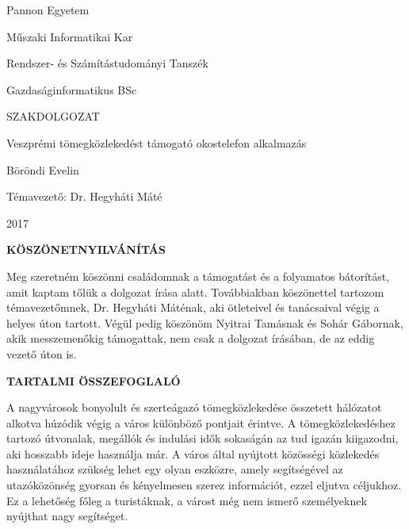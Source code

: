 \documentclass[a4paper,oneside,10pt]{report}
\begin{document}
\begin{titlepage}
\begin{center}
\Large
Pannon Egyetem

\vspace{10mm}
Műszaki Informatikai Kar

\vspace{10mm}
Rendszer- és Számítástudományi Tanszék

\vspace{10mm}
Gazdaságinformatikus BSc

\vspace{40mm}
\huge
SZAKDOLGOZAT

\vspace{10mm}
\LARGE
Veszprémi tömegközlekedést támogató okostelefon alkalmazás 

\vspace{10mm}
\Large
Böröndi Evelin

\vspace{40mm}
Témavezető: Dr. Hegyháti Máté

\vspace{10mm}
2017
\normalsize
\end{center}
\end{titlepage}



\pagestyle{empty} %



\newpage
\Large
\begin{center}
	\textbf{KÖSZÖNETNYILVÁNÍTÁS}
\end{center}
\normalsize
\noindent
Meg szeretném köszönni családomnak a támogatást és a folyamatos bátorítást, amit kaptam tőlük a dolgozat írása alatt. 
Továbbiakban köszönettel tartozom témavezetőmnek, Dr. Hegyháti Máténak, aki ötleteivel és tanácsaival végig a helyes úton tartott.
Végül pedig köszönöm Nyitrai Tamásnak és Sohár Gábornak, akik messzemenőkig támogattak, nem csak a dolgozat írásában, de az eddig vezető úton is.

\newpage
\Large
\begin{center}
	\textbf{TARTALMI ÖSSZEFOGLALÓ}
\end{center}
\normalsize
\noindent

A nagyvárosok bonyolult és szerteágazó tömegközlekedése összetett hálózatot alkotva húzódik végig a város különböző pontjait érintve.
A tömegközlekedéshez tartozó útvonalak, megállók és indulási idők sokaságán az tud igazán kiigazodni, aki hosszabb ideje használja már. 
A város által nyújtott közösségi közlekedés használatához szükség lehet egy olyan eszközre, amely segítségével az utazóközönség gyorsan és kényelmesen szerez információt, ezzel eljutva céljukhoz.
Ez a lehetőség főleg a turistáknak, a várost még nem ismerő személyeknek nyújthat nagy segítséget.
\end{document}
